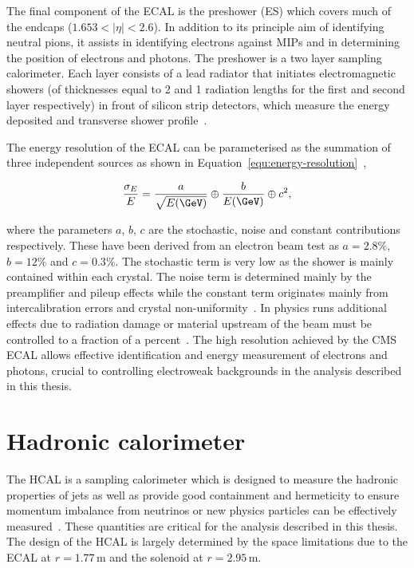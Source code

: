 The final component of the ECAL is the preshower (ES) which covers much of the endcaps ($1.653 < |\eta| < 2.6$). In addition
to its principle aim of identifying neutral pions, it assists in identifying electrons against MIPs and in
determining the position of electrons and photons. The preshower is a two layer sampling calorimeter. Each layer
consists of a lead radiator that initiates electromagnetic showers (of thicknesses equal to 2 and 1 radiation lengths for the 
first and second layer respectively) in front of silicon strip detectors, which 
measure the energy deposited and transverse shower profile~\cite{ecal_tdr}.  

The energy resolution of the ECAL can be parameterised as the summation of three independent sources as shown 
in Equation~\ref{equ:energy-resolution}~\cite{ecal_performance2},

\begin{equation}
\frac{\sigma_E}{E} = \frac{a}{\sqrt{E(\GeV)}} \oplus \frac{b}{E(\GeV)} \oplus c^2,
\label{equ:energy-resolution}
\end{equation}

where the parameters $a$, $b$, $c$ are the stochastic, noise and constant contributions respectively. These have been
derived from an electron beam test as $a=2.8\%$, $b=12\%$ and $c=0.3\%$. The stochastic
term is very low as the shower is mainly contained within each crystal. The noise term is determined mainly by 
the preamplifier and pileup effects while the constant term originates mainly from intercalibration errors and crystal non-uniformity~\cite{ecal_tdr}. 
In physics runs additional effects due to radiation damage or material upstream of the beam must be controlled to a 
fraction of a percent~\cite{ecal_performance}. The high resolution achieved by the CMS ECAL allows effective identification and energy measurement of electrons and photons, crucial to
controlling electroweak backgrounds in the analysis described in this thesis.

\section{Hadronic calorimeter}

The HCAL is a sampling calorimeter which is designed to measure the hadronic properties of jets as well as provide good 
containment and hermeticity to ensure momentum imbalance from neutrinos or new physics particles can be 
effectively measured~\cite{hcal_tdr}.
These quantities are critical for the analysis described in this thesis.
The design of the HCAL is largely determined by the space limitations due to the ECAL at $r = 1.77\,\text{m}$ and the solenoid at $r = 2.95\,\text{m}$.

